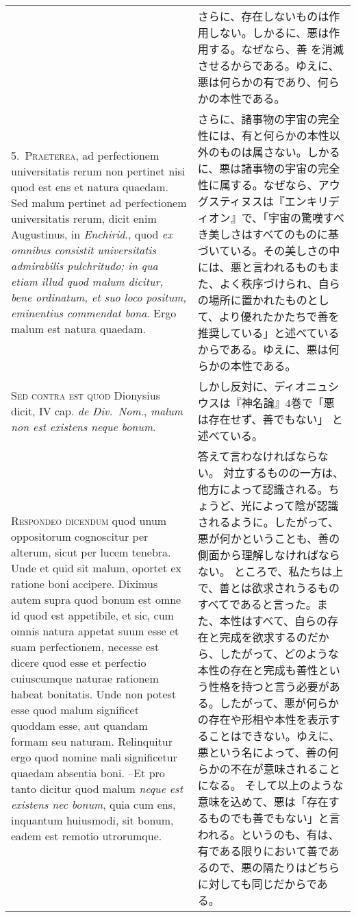 \documentclass[10pt]{jsarticle} %
\begin{document}
\begin{longtable}{p{21em}p{21em}}
&

さらに、存在しないものは作用しない。しかるに、悪は作用する。なぜなら、善
を消滅させるからである。ゆえに、悪は何らかの有であり、何らかの本性である。

\\


5.~{\scshape Praeterea}, ad perfectionem universitatis rerum non
pertinet nisi quod est ens et natura quaedam. Sed malum pertinet ad
perfectionem universitatis rerum, dicit enim Augustinus, in {\itshape Enchirid}.,
quod {\itshape ex omnibus consistit universitatis admirabilis pulchritudo; in qua
etiam illud quod malum dicitur, bene ordinatum, et suo loco positum,
eminentius commendat bona}. Ergo malum est natura quaedam.

&

さらに、諸事物の宇宙の完全性には、有と何らかの本性以外のものは属さない。しかるに、悪は諸事物の宇宙の完全性に属する。なぜなら、アウグスティヌスは『エンキリディオン』で、「宇宙の驚嘆すべき美しさはすべてのものに基づいている。その美しさの中には、悪と言われるものもまた、よく秩序づけられ、自らの場所に置かれたものとして、より優れたかたちで善を推奨している」と述べているからである。ゆえに、悪は何らかの本性である。

\\


{\scshape Sed contra est quod} Dionysius dicit, IV cap. {\itshape de
Div.~Nom}., {\itshape malum non est existens neque bonum}.

&

しかし反対に、ディオニュシウスは『神名論』4巻で「悪は存在せず、善でもない」
と述べている。

\\


{\scshape Respondeo dicendum} quod unum oppositorum cognoscitur per
alterum, sicut per lucem tenebra. Unde et quid sit malum, oportet ex
ratione boni accipere. Diximus autem supra quod bonum est omne id quod
est appetibile, et sic, cum omnis natura appetat suum esse et suam
perfectionem, necesse est dicere quod esse et perfectio cuiuscumque
naturae rationem habeat bonitatis. Unde non potest esse quod malum
significet quoddam esse, aut quandam formam seu naturam. Relinquitur
ergo quod nomine mali significetur quaedam absentia boni. --Et pro tanto
dicitur quod malum {\itshape neque est existens nec bonum}, quia cum
ens, inquantum huiusmodi, sit bonum, eadem est remotio utrorumque.

&
答えて言わなければならない。
対立するものの一方は、他方によって認識される。ちょうど、光によって陰が認識されるように。したがって、悪が何かということも、善の側面から理解しなければならない。
ところで、私たちは上で、善とは欲求されうるものすべてであると言った。また、本性はすべて、自らの存在と完成を欲求するのだから、したがって、どのような本性の存在と完成も善性という性格を持つと言う必要がある。したがって、悪が何らかの存在や形相や本性を表示することはできない。ゆえに、悪という名によって、善の何らかの不在が意味されることになる。
そして以上のような意味を込めて、悪は「存在するものでも善でもない」と言われる。というのも、有は、有である限りにおいて善であるので、悪の隔たりはどちらに対しても同じだからである。




\end{longtable}
\end{document}
